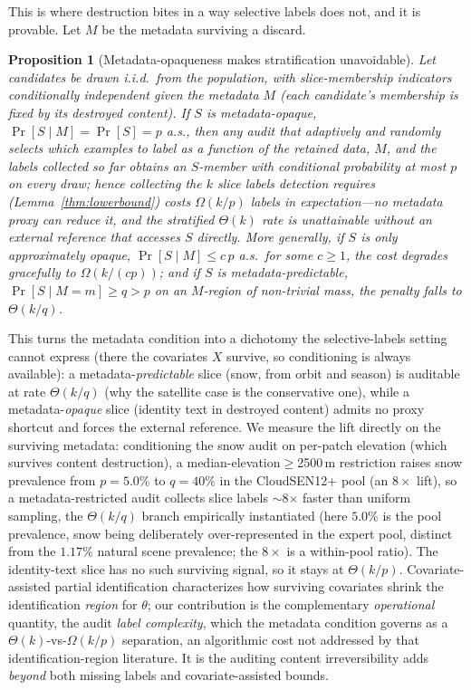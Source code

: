 \documentclass[conference]{IEEEtran}
\newtheorem{proposition}{Proposition}
\begin{document}
This is where destruction bites in a way selective labels does not, and it is provable. Let $M$ be the metadata
surviving a discard.
\begin{proposition}[Metadata-opaqueness makes stratification unavoidable]
\label{prop:opaque}
Let candidates be drawn i.i.d.\ from the population, with slice-membership indicators conditionally independent
given the metadata $M$ (each candidate's membership is fixed by its destroyed content). If $S$ is
\emph{metadata-opaque}, ${\Pr[S\mid M]=\Pr[S]=p}$ a.s., then any audit that adaptively and randomly selects which
examples to label as a function of the retained data, $M$, and the labels collected so far obtains an
$S$-member with conditional probability at most $p$ on every draw; hence collecting the $k$ slice labels
detection requires (Lemma~\ref{thm:lowerbound}) costs $\Omega(k/p)$ labels in expectation---no metadata proxy can
reduce it, and the stratified $\Theta(k)$ rate is unattainable without an external reference that accesses $S$
directly. More generally, if $S$ is only approximately opaque, $\Pr[S\mid M]\le c\,p$ a.s.\ for some $c\ge1$,
the cost degrades gracefully to $\Omega(k/(cp))$; and if $S$ is \emph{metadata-predictable},
$\Pr[S\mid M{=}m]\ge q>p$ on an $M$-region of non-trivial mass, the penalty falls to $\Theta(k/q)$.
\end{proposition}
\noindent This turns the metadata condition into a dichotomy the selective-labels setting cannot express (there
the covariates $X$ survive, so conditioning is always available): a metadata-\emph{predictable} slice (snow,
from orbit and season) is auditable at rate $\Theta(k/q)$ (why the satellite case is the conservative one),
while a metadata-\emph{opaque} slice (identity text in destroyed content) admits no proxy shortcut and forces
the external reference. We measure the lift directly on the surviving metadata: conditioning the snow audit on
per-patch elevation (which survives content destruction), a median-elevation$\ge$2500\,m restriction raises snow
prevalence from $p{=}5.0\%$ to $q{=}40\%$ in the CloudSEN12+ pool (an $8\times$ lift), so a metadata-restricted
audit collects slice labels $\sim$8$\times$ faster than uniform sampling, the $\Theta(k/q)$ branch empirically
instantiated (here $5.0\%$ is the pool prevalence, snow being deliberately over-represented in the expert pool,
distinct from the $1.17\%$ natural scene prevalence; the $8\times$ is a within-pool ratio). The
identity-text slice has no such surviving signal, so it stays at $\Theta(k/p)$. Covariate-assisted partial identification \cite{horowitz2000,miao2018} characterizes how surviving covariates shrink the identification
\emph{region} for $\theta$; our contribution is the complementary \emph{operational} quantity, the audit
\emph{label complexity}, which the metadata condition governs as a $\Theta(k)$-vs-$\Omega(k/p)$ separation, an
algorithmic cost not addressed by that identification-region literature. It is the auditing content
irreversibility adds \emph{beyond} both missing labels and covariate-assisted bounds.
\end{document}
